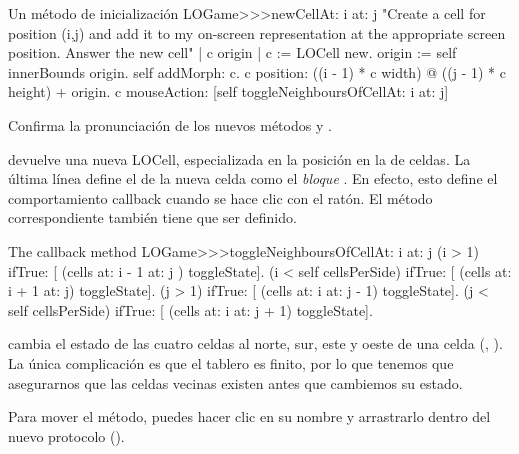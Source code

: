 \documentclass[a4paper,10pt,twoside]{book}
\begin{document}
\begin{method}[newCellAt:at:]{Un m\'etodo de inicializaci\'on}
LOGame>>>newCellAt: i at: j
   "Create a cell for position (i,j) and add it to my on-screen
   representation at the appropriate screen position.  Answer the new cell"
   | c origin |
   c := LOCell new.
   origin := self innerBounds origin.
   self addMorph: c.
   c position: ((i - 1) * c width) @ ((j - 1) * c height) + origin.
   c mouseAction: [self toggleNeighboursOfCellAt: i at: j]
\end{method}

Confirma la pronunciaci\'on de los nuevos m\'etodos  y .

 devuelve una nueva LOCell, especializada en la posici\'on  en la  de celdas.
La \'ultima l\'inea define el  de la nueva celda como el \emph{bloque}
\mbox{.}
En efecto, esto define el comportamiento callback cuando se hace clic con el rat\'on. 
El m\'etodo correspondiente tambi\'en tiene que ser definido. 

\begin{method}[toggleNeighboursOfCellAt:at:]{The callback method}
LOGame>>>toggleNeighboursOfCellAt: i at: j
   (i > 1) ifTrue: [ (cells at: i - 1 at: j ) toggleState].
   (i < self cellsPerSide) ifTrue: [ (cells at: i + 1 at: j) toggleState].
   (j > 1) ifTrue: [ (cells at: i  at: j - 1) toggleState].
   (j < self cellsPerSide) ifTrue: [ (cells at: i at: j + 1) toggleState].
\end{method}

 cambia el estado de las cuatro celdas al norte, sur, este y oeste de una celda (, ). La \'unica complicaci\'on es que el tablero es finito, por lo que tenemos que asegurarnos que las celdas vecinas existen antes que cambiemos su estado. 

Para mover el m\'etodo, puedes hacer clic en su nombre y arrastrarlo dentro del nuevo protocolo ().
\end{document}
